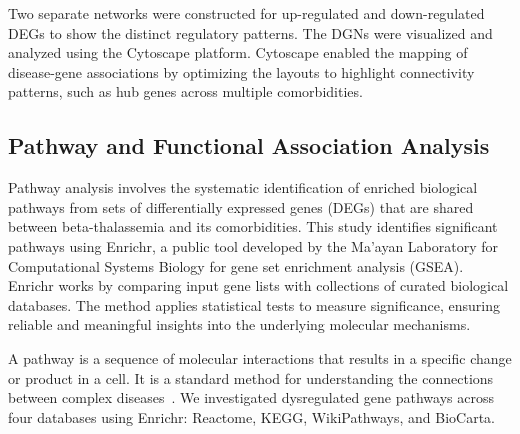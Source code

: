 Two separate networks were constructed for up-regulated and down-regulated DEGs to show the distinct regulatory patterns. The DGNs were visualized and analyzed using the Cytoscape platform. Cytoscape enabled the mapping of disease-gene associations by optimizing the layouts to highlight connectivity patterns, such as hub genes across multiple comorbidities.

\vspace*{-\parskip} %
\subsection{Pathway and Functional Association Analysis}
\label{sec:sec:sec3_4_4}

Pathway analysis involves the systematic identification of enriched biological pathways from sets of differentially expressed genes (DEGs) that are shared between beta-thalassemia and its comorbidities. This study identifies significant pathways using Enrichr, a public tool developed by the Ma'ayan Laboratory for Computational Systems Biology for gene set enrichment analysis (GSEA). Enrichr works by comparing input gene lists with collections of curated biological databases. The method applies statistical tests to measure significance, ensuring reliable and meaningful insights into the underlying molecular mechanisms.

A pathway is a sequence of molecular interactions that results in a specific change or product in a cell. It is a standard method for understanding the connections between complex diseases~\cite{pathway_ref}. We investigated dysregulated gene pathways across four databases using Enrichr: Reactome, KEGG, WikiPathways, and BioCarta.


